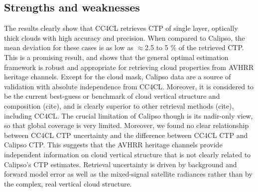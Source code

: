 \subsection{Strengths and weaknesses}

The results clearly show that CC4CL retrieves CTP of single layer, optically thick clouds with high accuracy and precision. When compared to Calipso, the mean deviation for these cases is as low as $\approx$2.5 to 5 \% of the retrieved CTP. This is a promising result, and shows that the general optimal estimation framework is robust and appropriate for retrieving cloud properties from AVHRR heritage channels. Except for the cloud mask, Calipso data are a source of validation with absolute independence from CC4CL. Moreover, it is considered to be the current best-guess or benchmark of cloud vertical structure and composition (cite), and is clearly superior to other retrieval methods (cite), including CC4CL. The crucial limitation of Calipso though is its nadir-only view, so that global coverage is very limited. Moreover, we found no clear relationship between CC4CL CTP uncertainty and the difference between CC4CL CTP and Calipso CTP. This suggests that the AVHRR heritage channels provide independent information on cloud vertical structure that is not clearly related to Calipso's CTP estimates. Retrieval uncertainty is driven by background and forward model error as well as the mixed-signal satellite radiances rather than by the complex, real vertical cloud structure.

